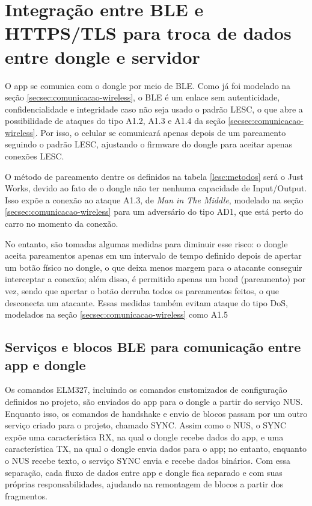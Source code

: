\documentclass[
	12pt,
	article,			%
	oneside,
	a4paper,
	english,
	brazil				%
	]{abntex2}
\begin{document}
\section{Integração entre BLE e HTTPS/TLS para troca de dados entre dongle e servidor}

O app se comunica com o dongle por meio de BLE. Como já foi modelado na seção \ref{secsec:comunicacao-wireless}, o BLE
é um enlace sem autenticidade, confidencialidade e integridade caso não seja usado o padrão LESC, o que abre
a possibilidade de ataques do tipo A1.2, A1.3 e A1.4 da seção \ref{secsec:comunicacao-wireless}. Por isso, o celular se comunicará
apenas depois de um pareamento seguindo o padrão LESC, ajustando o firmware do dongle para aceitar apenas conexões LESC.

O método de pareamento dentre os definidos na tabela \ref{lesc:metodos} será o Just Works, devido ao fato de o dongle não
ter nenhuma capacidade de Input/Output. Isso expõe a conexão ao ataque A1.3, de \textit{Man in The Middle}, modelado na seção
\ref{secsec:comunicacao-wireless} para um adversário do tipo AD1, que está perto do carro no momento da conexão. 

No entanto, são tomadas algumas medidas para diminuir esse risco:
o dongle aceita pareamentos apenas em um intervalo de tempo definido depois de apertar um botão físico no dongle, o que deixa menos
margem para o atacante conseguir interceptar a conexão; além disso, é permitido apenas um bond (pareamento) por vez, sendo que apertar o 
botão derruba todos os pareamentos feitos, o que desconecta um atacante. Essas medidas também evitam ataque do tipo DoS, modelados 
na seção \ref{secsec:comunicacao-wireless} como A1.5

\subsection{Serviços e blocos BLE para comunicação entre app e dongle} \label{sec:app-ble-dongle}

Os comandos ELM327, incluindo os comandos customizados de configuração definidos no projeto, são enviados do app para o dongle a partir 
do serviço NUS. Enquanto isso, os comandos de handshake e envio de blocos passam por um outro serviço criado para o projeto, chamado 
SYNC. Assim como o NUS, o SYNC expõe uma característica RX, na qual o dongle recebe dados do app, e uma característica TX, na qual 
o dongle envia dados para o app; no entanto, enquanto o NUS recebe texto, o serviço SYNC envia e recebe dados binários. Com essa separação,
cada fluxo de dados entre app e dongle fica separado e com suas próprias responsabilidades, ajudando na remontagem de blocos a partir dos fragmentos.
\end{document}
